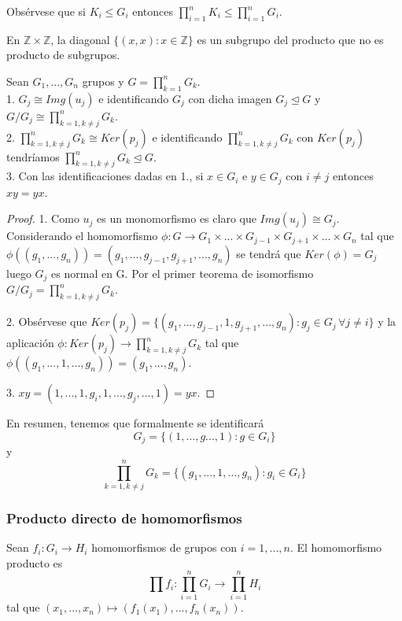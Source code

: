 Obsérvese que si $K_i \le G_i$ entonces $\prod_{i=1}^{n} K_i \le \prod_{i=1}^{n} G_i$.

\begin{example}
En $\mathbb{Z} \times \mathbb{Z}$, la diagonal $\{(x,x):x \in \mathbb{Z}\}$ es un subgrupo del producto que no es producto de subgrupos.
\end{example}

\begin{proposition}
Sean $G_1,...,G_n$ grupos y $G = \prod_{k=1}^{n} G_k$. \\
1. $G_j \cong Img(u_j)$ e identificando $G_j$ con dicha imagen $G_j \trianglelefteq G$ y $G/G_j \cong \prod_{k=1,k \neq j}^{n} G_k$. \\
2. $\prod_{k=1,k \neq j}^{n} G_k \cong Ker(p_j)$ e identificando $\prod_{k=1,k \neq j}^{n} G_k$ con $Ker(p_j)$ tendríamos $\prod_{k=1,k \neq j}^{n} G_k \trianglelefteq G$.\\ 
3. Con las identificaciones dadas en 1., si $x \in G_i$ e $y \in G_j$ con $i \neq j$ entonces $xy = yx$.
\end{proposition}
\begin{proof}
1. Como $u_j$ es un monomorfismo es claro que $Img(u_j) \cong G_j$. Considerando el homomorfismo $\phi:G \rightarrow G_1 \times ... \times G_{j-1} \times G_{j+1} \times ... \times G_n$ tal que $\phi((g_1,...,g_n)) = (g_1,...,g_{j-1},g_{j+1},...,g_n)$ se tendrá que $Ker(\phi) = G_j$ luego $G_j$ es normal en G. Por el primer teorema de isomorfismo $G/G_j = \prod_{k=1,k \neq j}^{n} G_k$.

2. Obsérvese que $Ker(p_j) = \{(g_1,...,g_{j-1},1,g_{j+1},...,g_n):g_j \in G_j \, \forall j \neq i\}$ y la aplicación $\phi:Ker(p_j) \rightarrow \prod_{k=1,k \neq j}^{n} G_k$ tal que $\phi((g_1,...,1,...,g_n)) = (g_1,...,g_n)$.

3. $xy = (1,...,1,g_i,1,...,g_j,...,1) = yx$.
\end{proof}

En resumen, tenemos que formalmente se identificará $$G_j = \{(1,...,g...,1):g \in G_i\}$$ y $$\prod_{k=1,k \neq j}^{n} G_k = \{(g_1,...,1,...,g_n):g_i \in G_i\}$$

\subsubsection{Producto directo de homomorfismos}

\begin{definition}
Sean $f_i:G_i \rightarrow H_i$ homomorfismos de grupos con $i=1,...,n$. El homomorfismo producto es $$\prod f_i:\prod_{i=1}^{n} G_i \rightarrow \prod_{i=1}^{n} H_i$$ tal que $(x_1,...,x_n) \mapsto (f_1(x_1),...,f_n(x_n))$.
\end{definition}

